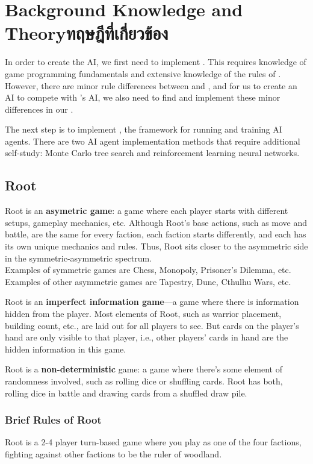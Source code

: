 \chapter{\ifenglish Background Knowledge and Theory\else ทฤษฎีที่เกี่ยวข้อง\fi}

In order to create the AI, we first need to implement \RootOurs{}. This requires knowledge of game programming fundamentals and extensive knowledge of the rules of \RootB{}. However, there are minor rule differences between \RootV{} and \RootB{}, and for us to create an AI to compete with \RootV{}’s AI, we also need to find and implement these minor differences in our \RootOurs{}.

The next step is to implement \RootAI{}, the framework for running \RootOurs{} and training AI agents. There are two AI agent implementation methods that require additional self-study: Monte Carlo tree search and reinforcement learning neural networks.

\section{Root}
Root is an \textbf{asymetric game}: a game where each player starts with different setups, gameplay mechanics, etc. Although Root’s base actions, such as move and battle, are the same for every faction, each faction starts differently, and each has its own unique mechanics and rules. Thus, Root sits closer to the asymmetric side in the symmetric-asymmetric spectrum. \\
Examples of symmetric games are Chess, Monopoly, Prisoner's Dilemma, etc.\\
Examples of other asymmetric games are Tapestry, Dune, Cthulhu Wars, etc.

Root is an \textbf{imperfect information game}—a game where there is information hidden from the player. Most elements of Root, such as warrior placement, building count, etc., are laid out for all players to see. But cards on the player’s hand are only visible to that player, i.e., other players’ cards in hand are the hidden information in this game.

Root is a \textbf{non-deterministic} game: a game where there’s some element of randomness involved, such as rolling dice or shuffling cards. Root has both, rolling dice in battle and drawing cards from a shuffled draw pile.

\subsection{Brief Rules of Root} \label{brief-rules-of-root}
Root is a 2-4 player turn-based game where you play as one of the four factions, fighting against other factions to be the ruler of woodland.

